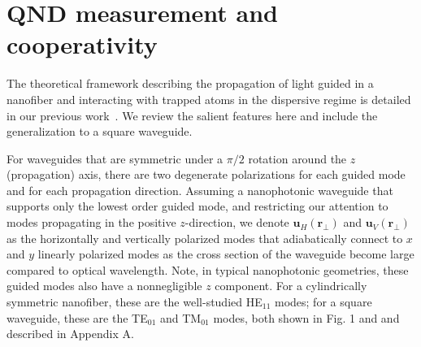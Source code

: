 \documentclass[preprint,aps,pra,onecolumn,superscriptaddress]{revtex4-1} %
\newcommand{\mbf}[1]{\mathbf{#1}}
\begin{document}
\section{QND measurement and cooperativity} \label{Sec::Theory}
The theoretical framework describing the propagation of light guided in a nanofiber and interacting with trapped atoms in the dispersive regime is detailed in our previous work~\cite{Qi2016}.  We review the salient features here and include the generalization to a square waveguide.

For waveguides that are symmetric under a $\pi/2$ rotation around the $z$ (propagation) axis, there are two degenerate polarizations for each guided mode and for each propagation direction.  Assuming a nanophotonic waveguide that supports only the lowest order guided mode, and restricting our attention to modes propagating in the positive $z$-direction, we denote $\mbf{u}_H(\mbf{r}_\perp)$ and  $\mbf{u}_V(\mbf{r}_\perp)$ as the horizontally and vertically polarized modes that adiabatically connect to $x$ and $y$ linearly polarized modes as the cross section of the waveguide become large compared to optical wavelength.  Note, in typical nanophotonic geometries, these guided modes also have a nonnegligible $z$ component.  For a cylindrically symmetric nanofiber, these are the well-studied HE$_{11}$ modes; for a square waveguide, these are the TE$_{01}$ and TM$_{01}$ modes, both shown in Fig. 1 and and described in Appendix A.
\end{document}
